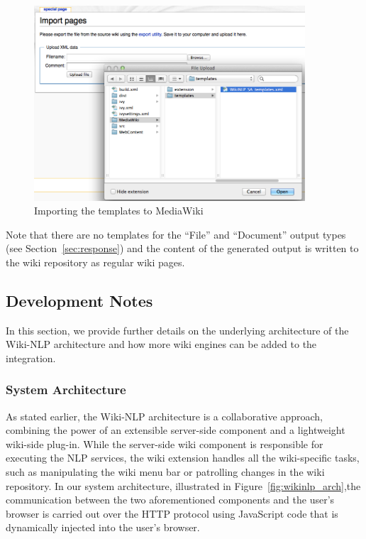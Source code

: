 \begin{figure}
\centering
\includegraphics[width=0.9\textwidth]{pictures/wiki_template_import.png}
\caption{Importing the \sa templates to MediaWiki}
\label{fig:wiki_template_import}
\end{figure}

Note that there are no templates for the ``File'' and ``Document'' output types (see Section~\ref{sec:response}) and the content of the generated output is written to the wiki repository as regular wiki pages.

\subsection{Development Notes}
In this section, we provide further details on the underlying architecture of the Wiki-NLP architecture and how more wiki engines can be added to the integration.

\subsubsection{System Architecture}
As stated earlier, the Wiki-NLP architecture is a collaborative approach, combining the power of an extensible server-side component and a lightweight wiki-side plug-in. While the server-side wiki component is responsible for executing the NLP services, the wiki extension handles all the wiki-specific tasks, such as manipulating the wiki menu bar or patrolling changes in the wiki repository. In our system architecture, illustrated in Figure~\ref{fig:wikinlp_arch},the communication between the two aforementioned components and the user's browser is carried out over the HTTP protocol using JavaScript code that is dynamically injected into the user's browser.


